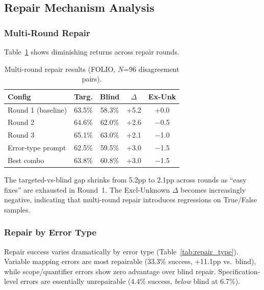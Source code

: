 \documentclass[11pt,a4paper]{article}
\begin{document}
\subsection{Repair Mechanism Analysis}
\label{sec:repair}

\subsubsection{Multi-Round Repair}

Table~\ref{tab:repair_rounds} shows diminishing returns across repair rounds.

\begin{table}[t]
\centering
\small
\caption{Multi-round repair results (FOLIO, $N$=96 disagreement pairs).}
\label{tab:repair_rounds}
\begin{tabular}{lcccc}
\toprule
\textbf{Config} & \textbf{Targ.} & \textbf{Blind} & $\Delta$ & \textbf{Ex-Unk} \\
\midrule
Round 1 (baseline) & 63.5\% & 58.3\% & +5.2 & +0.0 \\
Round 2 & 64.6\% & 62.0\% & +2.6 & $-$0.5 \\
Round 3 & 65.1\% & 63.0\% & +2.1 & $-$1.0 \\
Error-type prompt & 62.5\% & 59.5\% & +3.0 & $-$1.5 \\
Best combo & 63.8\% & 60.8\% & +3.0 & $-$1.5 \\
\bottomrule
\end{tabular}
\end{table}

The targeted-vs-blind gap shrinks from 5.2pp to 2.1pp across rounds as ``easy fixes'' are exhausted in Round~1. The Excl-Unknown $\Delta$ becomes increasingly negative, indicating that multi-round repair introduces regressions on True/False samples.

\subsubsection{Repair by Error Type}

Repair success varies dramatically by error type (Table~\ref{tab:repair_type}). Variable mapping errors are most repairable (33.3\% success, +11.1pp vs.\ blind), while scope/quantifier errors show zero advantage over blind repair. Specification-level errors are essentially unrepairable (4.4\% success, \textit{below} blind at 6.7\%).
\end{document}

